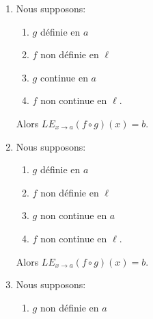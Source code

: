 \begin{theorem}
\begin{enumerate}
\begin{multicols}{2}
                \begin{enumerate}
                \item \( g\) définie en \( a\)
                \item \( f\) définie en \( \ell\)
                \item \( g\) non continue en \( a\)
                \item \( f\) non continue en \( \ell\).
                \end{enumerate}
            \end{multicols}
            Alors nous ne disons rien.
        \item   \label{ITEMooANFQooWVrfTd}      %
            Nous supposons:
            \begin{multicols}{2}
                \begin{enumerate}
                \item \( g\) définie en \( a\)
                \item \( f\) non définie en \( \ell\)
                \item \( g\) continue en \( a\)
                \item \( f\) non continue en \( \ell\).
                \end{enumerate}
            \end{multicols}
            Alors \( {LE}_{x\to a}(f\circ g)(x)=b\).
        \item   \label{ITEMooDJBHooSlqpOO}      %
            Nous supposons:
            \begin{multicols}{2}
                \begin{enumerate}
                \item \( g\) définie en \( a\)
                \item \( f\) non définie en \( \ell\)
                \item \( g\) non continue en \( a\)
                \item \( f\) non continue en \( \ell\).
                \end{enumerate}
            \end{multicols}
            Alors \( {LE}_{x\to a}(f\circ g)(x)=b\).
        \item   \label{ITEMooUFJHooRzLglZ}      %
            Nous supposons:
            \begin{multicols}{2}
                \begin{enumerate}
                \item \( g\) non définie en \( a\)

\end{enumerate}
\end{multicols}
\end{enumerate}
\end{theorem}
